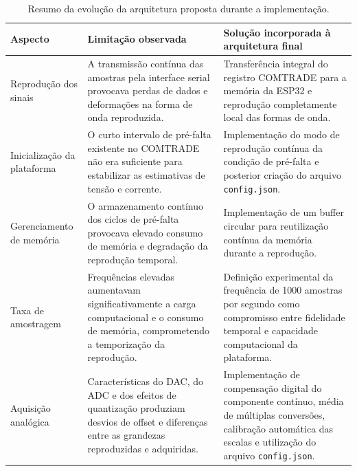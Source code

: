 \begin{table}[H]
  \centering
  \small
  \caption{Resumo da evolução da arquitetura proposta durante a implementação.}
  \label{tab:evolucao-plataforma}
  \begin{tabular}{p{3.2cm}p{5.1cm}p{5.2cm}}
    \toprule
    Aspecto &
    Limitação observada &
    Solução incorporada à arquitetura final \\
    \midrule

    Reprodução dos sinais &
    A transmissão contínua das amostras pela interface serial provocava perdas de dados e deformações na forma de onda reproduzida. &
    Transferência integral do registro COMTRADE para a memória da ESP32 e reprodução completamente local das formas de onda. \\

    Inicialização da plataforma &
    O curto intervalo de pré-falta existente no COMTRADE não era suficiente para estabilizar as estimativas de tensão e corrente. &
    Implementação do modo de reprodução contínua da condição de pré-falta e posterior criação do arquivo \texttt{config.json}. \\

    Gerenciamento de memória &
    O armazenamento contínuo dos ciclos de pré-falta provocava elevado consumo de memória e degradação da reprodução temporal. &
    Implementação de um buffer circular para reutilização contínua da memória durante a reprodução. \\

    Taxa de amostragem &
    Frequências elevadas aumentavam significativamente a carga computacional e o consumo de memória, comprometendo a temporização da reprodução. &
    Definição experimental da frequência de 1000 amostras por segundo como compromisso entre fidelidade temporal e capacidade computacional da plataforma. \\

    Aquisição analógica &
    Características do DAC, do ADC e dos efeitos de quantização produziam desvios de offset e diferenças entre as grandezas reproduzidas e adquiridas. &
    Implementação de compensação digital do componente contínuo, média de múltiplas conversões, calibração automática das escalas e utilização do arquivo \texttt{config.json}. \\

    \bottomrule
  \end{tabular}
\end{table}

